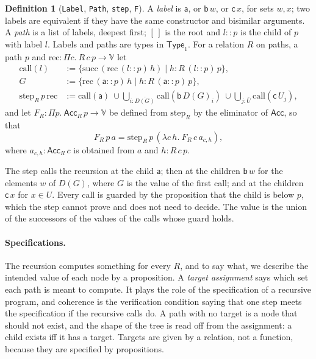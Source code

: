 \documentclass[10pt]{article}
\theoremstyle{definition}
\newtheorem{definition}[theorem]{Definition}
\theoremstyle{remark}
\newcommand{\Type}{\mathsf{Type}}
\newcommand{\Acc}{\mathsf{Acc}}
\newcommand{\V}{\mathbb{V}}
\newcommand{\la}{\mathsf{a}}
\newcommand{\lb}{\mathsf{b}}
\newcommand{\lc}{\mathsf{c}}
\newcommand{\lean}[1]{\texttt{#1}}
\newcommand{\guard}[2]{\{#1\mid #2\}}
\begin{document}
\begin{definition}[\lean{Label}, \lean{Path}, \lean{step}, \lean{F}]\label{def:mat}
A \emph{label} is $\la$, or $\lb\,w$, or $\lc\,x$, for sets $w,x$; two
labels are equivalent if they have the same constructor and
bisimilar arguments. A \emph{path} is a list of labels, deepest first;
$[\,]$ is the root and $l::p$ is the child of $p$ with label $l$. Labels
and paths are types in $\Type_1$. For a relation $R$ on paths, a path $p$
and $\mathrm{rec}:\Pi c.\ R\,c\,p\to\V$ let
\begin{align*}
\mathrm{call}(l)&:=\guard{\mathrm{succ}\,(\mathrm{rec}\,(l::p)\,h)}{h:R\,(l::p)\,p},\\
G&:=\guard{\mathrm{rec}\,(\la::p)\,h}{h:R\,(\la::p)\,p},\\
\mathrm{step}_R\,p\,\mathrm{rec}&:=\mathrm{call}(\la)\ \cup
  \textstyle\bigcup_{i:\overline{D(G)}}\mathrm{call}(\lb\,D(G)_i)\ \cup
  \bigcup_{j:\bar U}\mathrm{call}(\lc\,U_j),
\end{align*}
and let $F_R:\Pi p.\ \Acc_R\,p\to\V$ be defined from $\mathrm{step}_R$ by the
eliminator of $\Acc$, so that
\[F_R\,p\,a=\mathrm{step}_R\,p\,(\lambda c\,h.\ F_R\,c\,a_{c,h}),\]
where $a_{c,h}:\Acc_R\,c$ is obtained from $a$ and $h:R\,c\,p$.
\end{definition}

The step calls the recursion at the child $\la$; then at the children
$\lb\,w$ for the elements $w$ of $D(G)$, where $G$ is the value of the
first call; and at the children $\lc\,x$ for $x\in U$. Every call is
guarded by the proposition that the child is below $p$, which the step
cannot prove and does not need to decide. The value is the union of the
successors of the values of the calls whose guard holds.

\paragraph{Specifications.}
The recursion computes something for every $R$, and to say what, we
describe the intended value of each node by a proposition. A
\emph{target assignment} says which set each path is meant to compute. It
plays the role of the specification of a recursive program, and
coherence is the verification condition saying that one step meets the
specification if the recursive calls do. A path with no target is a
node that should not exist, and the shape of the tree is read off from
the assignment: a child exists iff it has a target. Targets are given
by a relation, not a function, because they are specified by
propositions.
\end{document}
